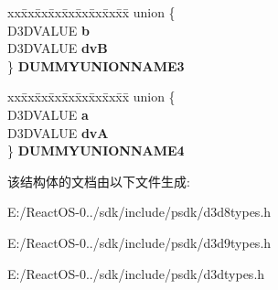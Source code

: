 \begin{DoxyCompactItemize}
\begin{tabbing}
\end{tabbing}\item 
\mbox{\label{struct___d3_d_c_o_l_o_r_v_a_l_u_e_a94a4d52e44b73b3f2f089eecedcf1250}} 
\begin{tabbing}
xx\=xx\=xx\=xx\=xx\=xx\=xx\=xx\=xx\=\kill
union \{\\
\>D3DVALUE {\bfseries b}\\
\>D3DVALUE {\bfseries dvB}\\
\} {\bfseries DUMMYUNIONNAME3}\\

\end{tabbing}\item 
\mbox{\label{struct___d3_d_c_o_l_o_r_v_a_l_u_e_a2ec40d7c083be0ef676c7f750a63efc0}} 
\begin{tabbing}
xx\=xx\=xx\=xx\=xx\=xx\=xx\=xx\=xx\=\kill
union \{\\
\>D3DVALUE {\bfseries a}\\
\>D3DVALUE {\bfseries dvA}\\
\} {\bfseries DUMMYUNIONNAME4}\\

\end{tabbing}\end{DoxyCompactItemize}


该结构体的文档由以下文件生成\+:\begin{DoxyCompactItemize}
\item 
E\+:/\+React\+O\+S-\/0../sdk/include/psdk/d3d8types.\+h\item 
E\+:/\+React\+O\+S-\/0../sdk/include/psdk/d3d9types.\+h\item 
E\+:/\+React\+O\+S-\/0../sdk/include/psdk/d3dtypes.\+h\end{DoxyCompactItemize}
